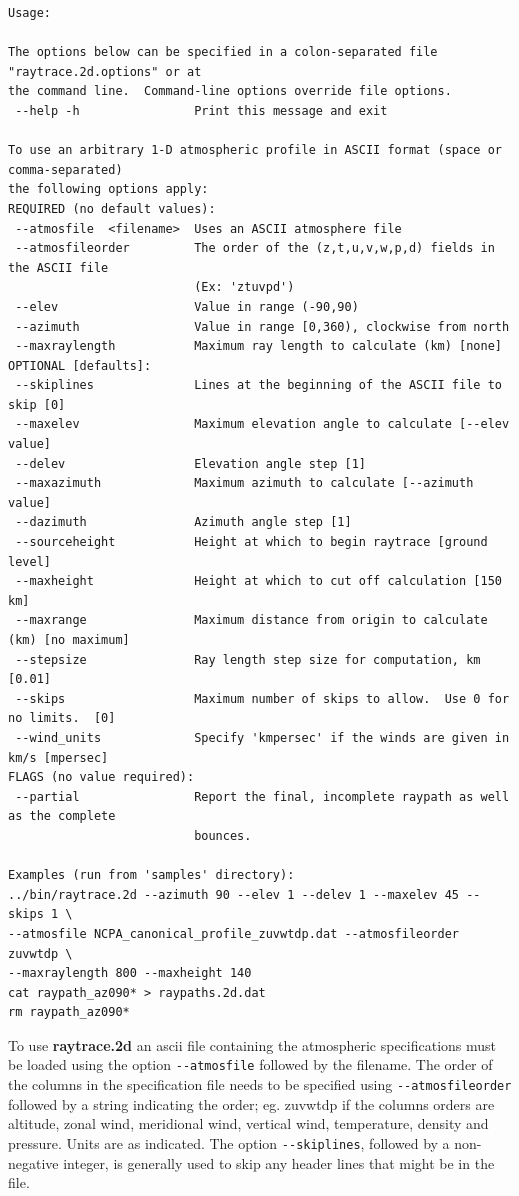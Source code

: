 \begin{verbatim}
Usage: 

The options below can be specified in a colon-separated file "raytrace.2d.options" or at
the command line.  Command-line options override file options.
 --help -h                Print this message and exit

To use an arbitrary 1-D atmospheric profile in ASCII format (space or comma-separated) 
the following options apply:
REQUIRED (no default values):
 --atmosfile  <filename>  Uses an ASCII atmosphere file
 --atmosfileorder         The order of the (z,t,u,v,w,p,d) fields in the ASCII file 
                          (Ex: 'ztuvpd')
 --elev                   Value in range (-90,90)
 --azimuth                Value in range [0,360), clockwise from north
 --maxraylength           Maximum ray length to calculate (km) [none]
OPTIONAL [defaults]:
 --skiplines              Lines at the beginning of the ASCII file to skip [0]
 --maxelev                Maximum elevation angle to calculate [--elev value]
 --delev                  Elevation angle step [1]
 --maxazimuth             Maximum azimuth to calculate [--azimuth value]
 --dazimuth               Azimuth angle step [1]
 --sourceheight           Height at which to begin raytrace [ground level]
 --maxheight              Height at which to cut off calculation [150 km]
 --maxrange               Maximum distance from origin to calculate (km) [no maximum]
 --stepsize               Ray length step size for computation, km [0.01]
 --skips                  Maximum number of skips to allow.  Use 0 for no limits.  [0]
 --wind_units             Specify 'kmpersec' if the winds are given in km/s [mpersec]
FLAGS (no value required):
 --partial                Report the final, incomplete raypath as well as the complete 
                          bounces.

Examples (run from 'samples' directory):
../bin/raytrace.2d --azimuth 90 --elev 1 --delev 1 --maxelev 45 --skips 1 \
--atmosfile NCPA_canonical_profile_zuvwtdp.dat --atmosfileorder zuvwtdp \
--maxraylength 800 --maxheight 140
cat raypath_az090* > raypaths.2d.dat
rm raypath_az090*
\end{verbatim}

To use {\bf raytrace.2d} an ascii file containing the atmospheric specifications must be loaded using the option \verb+--atmosfile+ followed by the filename. The order of the columns in the specification file needs to be specified using \verb+--atmosfileorder+ followed by a string indicating the order; eg. zuvwtdp if the columns orders are altitude, zonal wind, meridional wind, vertical wind, temperature, density and pressure. Units are as indicated. The option \verb+--skiplines+, followed by a non-negative integer, is generally used to skip any header lines that might be in the file.

